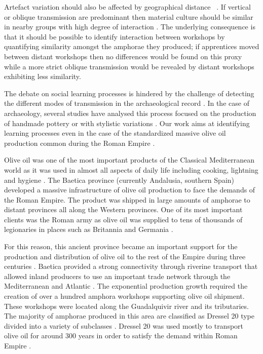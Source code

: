 \documentclass[review]{elsarticle}
\begin{document}
Artefact variation should also be affected by geographical distance ~\citep{bjorklund_effect_2010,shennan_isolation-by-distance_2015, van_strien_isolation-by-distance_2015}. If vertical or oblique transmission are predominant then material culture should be similar in nearby groups with high degree of interaction \citep{hart_effects_2012}. The underlying consequence is that it should be possible to identify interaction between workshops by quantifying similarity amongst the amphorae they produced; if apprentices moved between distant workshops then no differences would be found on this proxy while a more strict oblique transmission would be revealed by distant workshops exhibiting less similarity.

The debate on social learning processes is hindered by the challenge of detecting the different modes of transmission in the archaeological record \citep{roux_standardization_2015}. In the case of archaeology, several studies have analysed this process focused on the production of handmade pottery \citep{steele_james_ceramic_2010} or with stylistic variations \citep{neiman_stylistic_1995, shennan_ceramic_2001}.
Our work aims at identifying learning processes even in the case of the standardized massive olive oil production common during the Roman Empire \citep{bevan_mediterranean_2014}. 

Olive oil was one of the most important products of the Classical Mediterranean world as it was used in almost all aspects of daily life including cooking, lightning and hygiene \citep{mattingly_d.j._oil_1988}. The Baetica province (currently Andalusia, southern Spain) developed a massive infrastructure of olive oil production to face the demands of the Roman Empire. The product was shipped in large amounts of amphorae to distant provinces all along the Western provinces. One of its most important clients was the Roman army as olive oil was supplied to tens of thousands of legionaries in places such as Britannia \citep{monfort_britannia_1998,funari_economic_2005} and Germania \citep{remesal_annona_1986}. 

For this reason, this ancient province became an important support for the production and distribution of olive oil to the rest of the Empire during three centuries \citep{millet_anforas_1998, rodriguez_baetican_1998,chic2005comercio}. Baetica provided a strong connectivity through riverine transport that allowed inland producers to use an important trade network through the Mediterranean and Atlantic \citep{garcia_vargas_enrique_formal_2010}. The exponential production growth required the creation of over a hundred amphora workshops supporting olive oil shipment. These workshops were located along the Guadalquivir river and its tributaries. The majority of amphorae produced in this area are classified as Dressel 20 type divided into a variety of subclasses \citep{martin-kilcher_romischen_1994,berni_millet_epigrafianforica_2008}. Dressel 20 was used mostly to transport olive oil for around 300 years in order to satisfy the demand within Roman Empire \citep{rodriguez_economioleicola_1977}. 
\end{document}
